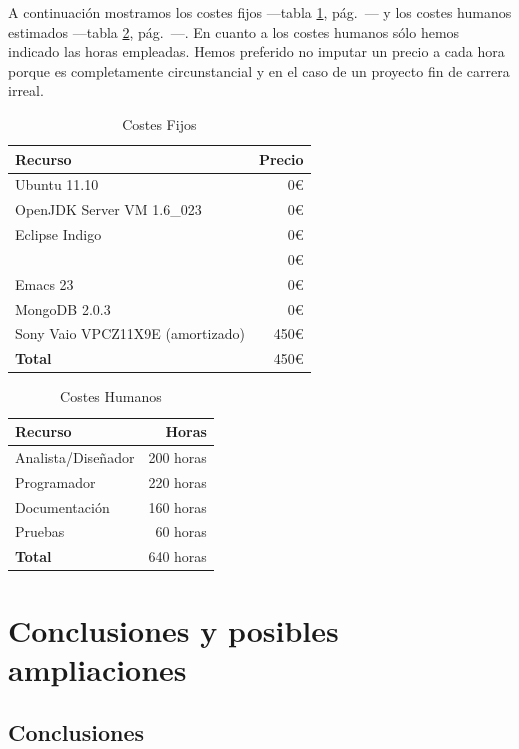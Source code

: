 A continuación mostramos los costes fijos ---tabla \ref{fixed_costs},
pág.~\pageref{fixed_costs}--- y los costes humanos estimados ---tabla
\ref{human_costs}, pág.~\pageref{human_costs}---. En cuanto a los
costes humanos sólo hemos indicado las horas empleadas. Hemos
preferido no imputar un precio a cada hora porque es completamente
circunstancial y en el caso de un proyecto fin de carrera irreal.
\newpage
\begin{table}[hbp]
\begin{tabularx}{\textwidth}{X r}
\textbf{Recurso} & \textbf{Precio} \\\hline
Ubuntu 11.10 & 0€ \\
OpenJDK Server VM 1.6\_023 & 0€ \\
Eclipse Indigo & 0€ \\
\XeLaTeX{}  & 0€ \\
Emacs 23 & 0€ \\
MongoDB 2.0.3 & 0€ \\
Sony Vaio VPCZ11X9E (amortizado) & 450€ \\ \hline
\textbf{Total} & 450€ \\
\end{tabularx}
\caption{Costes Fijos}
\label{fixed_costs}
\end{table}

\begin{table}[hbp]
\begin{tabularx}{\textwidth}{X r}

\textbf{Recurso} & \textbf{Horas} \\ \hline
Analista/Diseñador & 200 horas\\
Programador & 220 horas \\
Documentación & 160 horas \\
Pruebas & 60 horas \\ \hline
\textbf{Total} & 640 horas \\
\end{tabularx}
\caption{Costes Humanos}
\label{human_costs}
\end{table}

\section{Conclusiones y posibles ampliaciones}

\subsection{Conclusiones}

